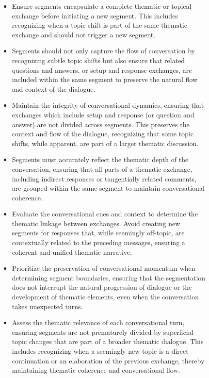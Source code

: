 \begin{figure}[htbp]
    \small
    \vspace{-5mm}
    \begin{tcolorbox}[left=3pt,right=3pt,top=3pt,bottom=3pt,title=\textbf{Segmentation rubric learned from \textit{TIAGE}}]
\begin{itemize}
    \item Ensure segments encapsulate a complete thematic or topical exchange before initiating a new segment. This includes recognizing when a topic shift is part of the same thematic exchange and should not trigger a new segment.

    \item Segments should not only capture the flow of conversation by recognizing subtle topic shifts but also ensure that related questions and answers, or setup and response exchanges, are included within the same segment to preserve the natural flow and context of the dialogue.

    \item Maintain the integrity of conversational dynamics, ensuring that exchanges which include setup and response (or question and answer) are not divided across segments. This preserves the context and flow of the dialogue, recognizing that some topic shifts, while apparent, are part of a larger thematic discussion.

    \item Segments must accurately reflect the thematic depth of the conversation, ensuring that all parts of a thematic exchange, including indirect responses or tangentially related comments, are grouped within the same segment to maintain conversational coherence.

    \item Evaluate the conversational cues and context to determine the thematic linkage between exchanges. Avoid creating new segments for responses that, while seemingly off-topic, are contextually related to the preceding messages, ensuring a coherent and unified thematic narrative.

    \item Prioritize the preservation of conversational momentum when determining segment boundaries, ensuring that the segmentation does not interrupt the natural progression of dialogue or the development of thematic elements, even when the conversation takes unexpected turns.

    \item Assess the thematic relevance of each conversational turn, ensuring segments are not prematurely divided by superficial topic changes that are part of a broader thematic dialogue. This includes recognizing when a seemingly new topic is a direct continuation or an elaboration of the previous exchange, thereby maintaining thematic coherence and conversational flow.


\end{itemize}
\end{tcolorbox}
\end{figure}
